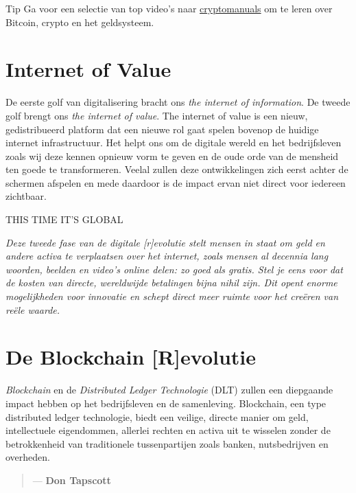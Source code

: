 \begin{tipbox}{Tip}
Ga voor een selectie van top video's naar  \href{https://cryptomanuals.com/5-videos-to-start-with-bitcoin}{cryptomanuals} om te leren over Bitcoin, crypto en het geldsysteem.
\end{tipbox}


\section*{Internet of Value}
De eerste golf van digitalisering bracht ons \emph{the internet of information}. De tweede golf brengt ons \emph{the internet of value}. The internet of value is een nieuw, gedistribueerd platform dat een nieuwe rol gaat spelen bovenop de huidige internet infrastructuur. Het helpt ons om de digitale wereld en het bedrijfsleven zoals wij deze kennen opnieuw vorm te geven en de oude orde van de mensheid ten goede te transformeren. Veelal zullen deze ontwikkelingen zich eerst achter de schermen afspelen en mede daardoor is de impact ervan niet direct voor iedereen zichtbaar. 

\bigskip
 
\begin{cryptobox}{THIS TIME IT'S GLOBAL}
  
\textit{Deze tweede fase van de digitale [r]evolutie stelt mensen in staat om geld en andere activa te verplaatsen over het internet, zoals mensen al decennia lang woorden, beelden en video's online delen: zo goed als gratis. Stel je eens voor dat de kosten van directe, wereldwijde betalingen bijna nihil zijn. Dit opent enorme mogelijkheden voor innovatie en schept direct meer ruimte voor het cre{\"e}ren van re{\"e}le waarde.}
\end{cryptobox}

\medskip

\section*{De Blockchain [R]evolutie}
\emph{Blockchain} en de \emph{Distributed Ledger Technologie} (DLT) zullen een diepgaande impact hebben op het bedrijfsleven en de samenleving. Blockchain, een type distributed ledger technologie, biedt een veilige, directe manier om geld, intellectuele eigendommen, allerlei rechten en activa uit te wisselen zonder de betrokkenheid van traditionele tussenpartijen zoals banken, nutsbedrijven en overheden.\medskip
 
\begin{quotation}
      \textit{}
      \begin{flushright}
        \small{--- \textbf{Don Tapscott}}
      \end{flushright}
\end{quotation}

